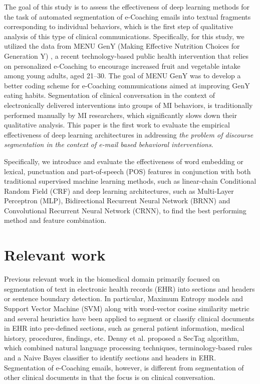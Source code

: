 \documentclass{amia}
\begin{document}
The goal of this study is to assess the effectiveness of deep learning methods for the task of automated segmentation of e-Coaching emails into textual fragments corresponding to individual behaviors, which is the first step of qualitative analysis of this type of clinical communications. Specifically, for this study, we utilized the data from MENU GenY (Making Effective Nutrition Choices for Generation Y) \cite{alexander2017motivations}, a recent technology-based public health intervention that relies on personalized e-Coaching to encourage increased fruit and vegetable intake among young adults, aged 21--30. The goal of MENU GenY was to develop a better coding scheme for e-Coaching communications aimed at improving GenY eating habits. Segmentation of clinical conversation in the context of electronically delivered interventions into groups of MI behaviors, is traditionally performed manually by MI researchers, which significantly slows down their qualitative analysis. This paper is the first work to evaluate the empirical effectiveness of deep learning architectures in addressing \textit{the problem of discourse segmentation in the context of e-mail based behavioral interventions}. 

Specifically, we introduce and evaluate the effectiveness of word embedding or lexical, punctuation and part-of-speech (POS) features in conjunction with both traditional supervised machine learning methods, such as linear-chain Conditional Random Field (CRF)\cite{lafferty2001conditional} and deep learning architectures, such as Multi-Layer Perceptron (MLP),\cite{rumelhart1986learning} Bidirectional Recurrent Neural Network (BRNN)\cite{schuster1997bidirectional} and Convolutional Recurrent Neural Network (CRNN),\cite{treviso2017sentence} to find the best performing method and feature combination. 

\section*{Relevant work}
Previous relevant work in the biomedical domain primarily focused on segmentation of text in electronic health records (EHR) into sections and headers \cite{apostolova2009automatic,denny2009evaluation,tepper2012statistical,cho2002text} or sentence boundary detection.\cite{griffis2016quantitative,kreuzthaler2015detection,treviso2017sentence} In particular, Maximum Entropy models \cite{tepper2012statistical} and Support Vector Machine (SVM) along with word-vector cosine similarity metric and several heuristics \cite{apostolova2009automatic} have been applied to segment or classify clinical documents in EHR into pre-defined sections, such as general patient information, medical history, procedures, findings, etc. Denny et al. \cite{denny2009evaluation} proposed a SecTag algorithm, which combined natural language processing techniques, terminology-based rules and a Naive Bayes classifier to identify sections and headers in EHR. Segmentation of e-Coaching emails, however, is different from segmentation of other clinical documents in that the focus is on clinical conversation.   
\end{document}
